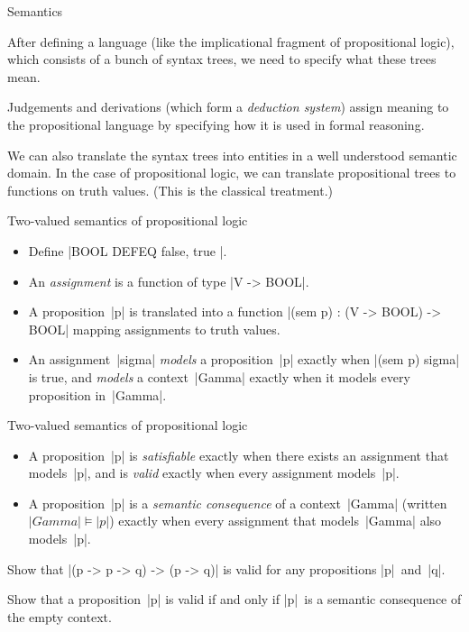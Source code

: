 \documentclass[t,compress,hyperref={hidelinks}]{beamer}
\begin{document}
\begin{frame}{Semantics}

After defining a language (like the implicational fragment of propositional logic), which consists of a bunch of syntax trees, we need to specify what these trees mean.

Judgements and derivations (which form a \emph{deduction system}) assign meaning to the propositional language by specifying how it is used in formal reasoning.

We can also translate the syntax trees into entities in a well understood semantic domain.
In the case of propositional logic, we can translate propositional trees to functions on truth values. (This is the classical treatment.)

\end{frame}

\begin{frame}{Two-valued semantics of propositional logic}

\begin{itemize}

\item Define |BOOL DEFEQ { false, true }|.

\item An \emph{assignment} is a function of type |V -> BOOL|.

\item A proposition~|p| is translated into a function |(sem p) : (V -> BOOL) -> BOOL| mapping assignments to truth values.

\item An assignment~|sigma| \emph{models} a proposition~|p| exactly when |(sem p) sigma| is true, and \emph{models} a context~|Gamma| exactly when it models every proposition in~|Gamma|.

\end{itemize}

\end{frame}

\begin{frame}{Two-valued semantics of propositional logic}

\begin{itemize}

\item A proposition~|p| is \emph{satisfiable} exactly when there exists an assignment that models~|p|, and is \emph{valid} exactly when every assignment models~|p|.

\item A proposition~|p| is a \emph{semantic consequence} of a context~|Gamma| (written $|Gamma| \models |p|$) exactly when every assignment that models~|Gamma| also models~|p|.

\end{itemize}

 Show that |(p -> p -> q) -> (p -> q)| is valid for any propositions |p|~and~|q|.

 Show that a proposition~|p| is valid if and only if |p|~is a semantic consequence of the empty context.

\end{frame}
\end{document}
